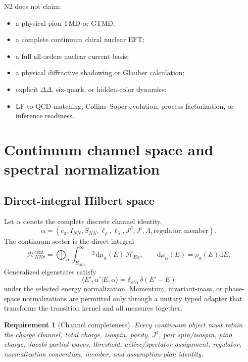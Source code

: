 \documentclass[11pt]{article}
\newtheorem{requirement}[definition]{Requirement}
\newcommand{\dd}{\mathrm{d}}
\newcommand{\Hil}{\mathcal H}
\newcommand{\HNNpi}{\Hil_{NN\pi}}
\begin{document}
N2 does not claim:
\begin{itemize}
\item a physical pion TMD or GTMD;
\item a complete continuum chiral nuclear EFT;
\item a full all-orders nuclear current basis;
\item a physical diffractive shadowing or Glauber calculation;
\item explicit \(\Delta\Delta\), six-quark, or hidden-color dynamics;
\item LF-to-QCD matching, Collins--Soper evolution, process factorization, or
      inference readiness.
\end{itemize}

\section{Continuum channel space and spectral normalization}
\label{sec:continuum}

\subsection{Direct-integral Hilbert space}

Let \(\alpha\) denote the complete discrete channel identity,
\begin{equation}
 \alpha=
 \left(
 c_\pi,I_{NN},S_{NN},\ell_\rho,\ell_\lambda,
 J^P,J^z,\Lambda,\text{regulator},\text{member}
 \right).
 \label{eq:channel-id}
\end{equation}
The continuum sector is the direct integral
\begin{equation}
 \HNNpi^{\mathrm{cont}}
 =
 \bigoplus_{\alpha}
 \int_{E_{\mathrm{th},\alpha}}^{\infty}\!{}^{\oplus}
 \dd\mu_\alpha(E)\,
 \Hil_{E\alpha},
 \qquad
 \dd\mu_\alpha(E)=\rho_\alpha(E)\dd E.
 \label{eq:direct-integral}
\end{equation}
Generalized eigenstates satisfy
\begin{equation}
 \langle E',\alpha'|E,\alpha\rangle
 =\delta_{\alpha'\alpha}\,\delta(E'-E)
 \label{eq:continuum-normalization}
\end{equation}
under the selected energy normalization.  Momentum, invariant-mass, or
phase-space normalizations are permitted only through a unitary typed adapter
that transforms the transition kernel and all measures together.

\begin{requirement}[Channel completeness]
Every continuum object must retain the charge channel, total charge, isospin,
parity, \(J^z\), pair spin/isospin, pion charge, Jacobi partial waves,
threshold, active/spectator assignment, regulator, normalization convention,
member, and assumption-plan identity.
\end{requirement}
\end{document}
